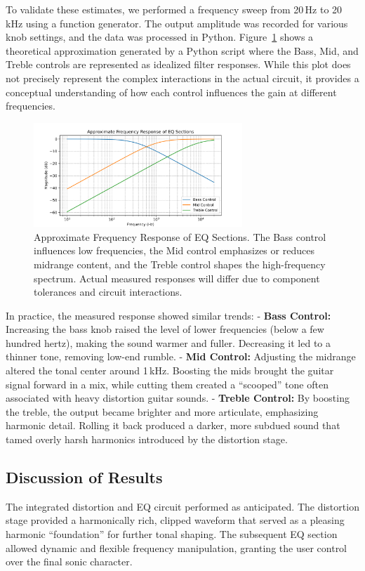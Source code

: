 \documentclass[12pt,a4paper]{article}
\begin{document}
To validate these estimates, we performed a frequency sweep from 20\,Hz to 20\,kHz using a function generator. The output amplitude was recorded for various knob settings, and the data was processed in Python. Figure~\ref{fig:eqresponse} shows a theoretical approximation generated by a Python script where the Bass, Mid, and Treble controls are represented as idealized filter responses. While this plot does not precisely represent the complex interactions in the actual circuit, it provides a conceptual understanding of how each control influences the gain at different frequencies.

\begin{figure}[h!]
\centering
\includegraphics[width=0.7\textwidth]{img/eq_frequency_response.png}
\caption{Approximate Frequency Response of EQ Sections. The Bass control influences low frequencies, the Mid control emphasizes or reduces midrange content, and the Treble control shapes the high-frequency spectrum. Actual measured responses will differ due to component tolerances and circuit interactions.}
\label{fig:eqresponse}
\end{figure}

In practice, the measured response showed similar trends:  
- \textbf{Bass Control:} Increasing the bass knob raised the level of lower frequencies (below a few hundred hertz), making the sound warmer and fuller. Decreasing it led to a thinner tone, removing low-end rumble.
- \textbf{Mid Control:} Adjusting the midrange altered the tonal center around 1\,kHz. Boosting the mids brought the guitar signal forward in a mix, while cutting them created a ``scooped'' tone often associated with heavy distortion guitar sounds.
- \textbf{Treble Control:} By boosting the treble, the output became brighter and more articulate, emphasizing harmonic detail. Rolling it back produced a darker, more subdued sound that tamed overly harsh harmonics introduced by the distortion stage.

\subsection{Discussion of Results}
The integrated distortion and EQ circuit performed as anticipated. The distortion stage provided a harmonically rich, clipped waveform that served as a pleasing harmonic ``foundation'' for further tonal shaping. The subsequent EQ section allowed dynamic and flexible frequency manipulation, granting the user control over the final sonic character.
\end{document}
